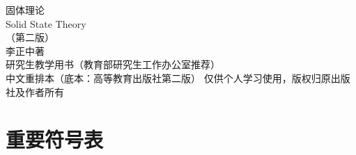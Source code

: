 \documentclass[11pt,a4paper,twoside,openright]{ctexbook}
\renewcommand{\theequation}{\thechapter.\arabic{section}.\arabic{equation}}
\begin{document}
\begin{titlepage}
\thispagestyle{empty}
\centering
\vspace*{3.2cm}
{\heiti 固体理论}\\[1.0em]
{\kaishu Solid State Theory}\\[1.2em]
{\kaishu （第二版）}\\[3em]
{\kaishu 李正中\quad 著}\\[2em]
{\kaishu 研究生教学用书（教育部研究生工作办公室推荐）}\\[1em]
{\kaishu 中文重排本（底本：高等教育出版社第二版）}
\vfill
{\kaishu 仅供个人学习使用，版权归原出版社及作者所有}
\end{titlepage}

\chapter*{重要符号表}

\clearpage

{\hypersetup{linktoc=all}\tableofcontents}
\clearpage















\setcounter{chapter}{0}
\renewcommand{\thechapter}{\Alph{chapter}}
\renewcommand{\theequation}{\thechapter.\arabic{equation}}










\end{document}

